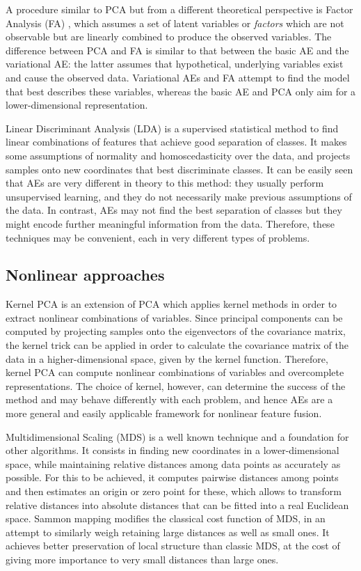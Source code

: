 \documentclass[preprint,5p,compress]{elsarticle}
\begin{document}
A procedure similar to PCA but from a different theoretical perspective is Factor Analysis (FA) \cite{PCAandFA}, which assumes a set of latent variables or \textit{factors} which are not observable but are linearly combined to produce the observed variables. The difference between PCA and FA is similar to that between the basic AE and the variational AE: the latter assumes that hypothetical, underlying variables exist and cause the observed data. Variational AEs and FA attempt to find the model that best describes these variables, whereas the basic AE and PCA only aim for a lower-dimensional representation.

Linear Discriminant Analysis (LDA) \cite{FisherLDA} is a supervised statistical method to find linear combinations of features that achieve good separation of classes. It makes some assumptions of normality and homoscedasticity over the data, and projects samples onto new coordinates that best discriminate classes. It can be easily seen that AEs are very different in theory to this method: they usually perform unsupervised learning, and they do not necessarily make previous assumptions of the data. In contrast, AEs may not find the best separation of classes but they might encode further meaningful information from the data. Therefore, these techniques may be convenient, each in very different types of problems.

\subsection{Nonlinear approaches}

Kernel PCA \cite{KernelPCA} is an extension of PCA which applies kernel methods in order to extract nonlinear combinations of variables. Since principal components can be computed by projecting samples onto the eigenvectors of the covariance matrix, the kernel trick can be applied in order to calculate the covariance matrix of the data in a higher-dimensional space, given by the kernel function. Therefore, kernel PCA can compute nonlinear combinations of variables and overcomplete representations. The choice of kernel, however, can determine the success of the method and may behave differently with each problem, and hence AEs are a more general and easily applicable framework for nonlinear feature fusion.

Multidimensional Scaling (MDS) \cite{MDS} is a well known technique and a foundation for other algorithms. It consists in finding new coordinates in a lower-dimensional space, while maintaining relative distances among data points as accurately as possible. For this to be achieved, it computes pairwise distances among points and then estimates an origin or zero point for these, which allows to transform relative distances into absolute distances that can be fitted into a real Euclidean space. Sammon mapping \cite{Sammon} modifies the classical cost function of MDS, in an attempt to similarly weigh retaining large distances as well as small ones. It achieves better preservation of local structure than classic MDS, at the cost of giving more importance to very small distances than large ones.  
\end{document}
